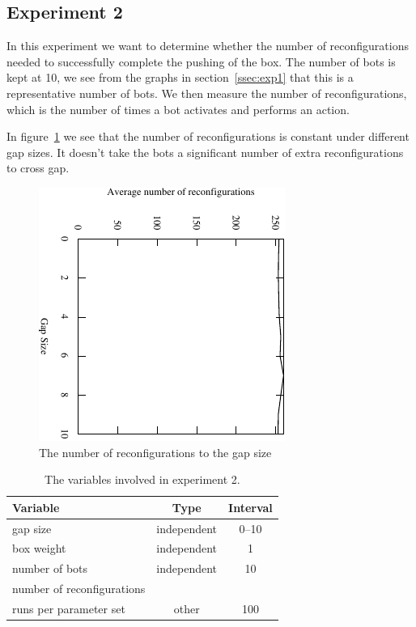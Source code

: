 \subsection{Experiment 2}
\label{ssec:exp2}

In this experiment we want to determine whether the number of reconfigurations
needed to successfully complete the pushing of the box. The number of bots is
kept at 10, we see from the graphs in section~\ref{ssec:exp1} that this is a
representative number of bots. We then measure the number of reconfigurations,
which is the number of times a bot activates and performs an action.

In figure~\ref{fig:exp2-plot} we see that the number of reconfigurations is
constant under different gap sizes. It doesn't take the bots a significant
number of extra reconfigurations to cross gap.

\begin{figure}
\centering
\includegraphics[width=0.6\linewidth,angle=90]{results/experiment2/plot}
\caption{The number of reconfigurations to the gap size}
\label{fig:exp2-plot}
\end{figure}

\begin{table}
 \caption{The variables involved in experiment 2.}
 \begin{center}
  \begin{tabular}{| p{5cm} | c | c |}
   \hline
   \centering \textbf{Variable} & \textbf{Type} & \textbf{Interval} \\ \hline
   gap size & independent & 0--10\\ \hline
   box weight & independent & 1 \\ \hline
   number of bots & independent & 10 \\ \hline
   number of reconfigurations &  \\ \hline
   runs per parameter set & other & 100 \\ \hline
  \end{tabular}
 \end{center}
 \label{tbl:exp2}
\end{table}
